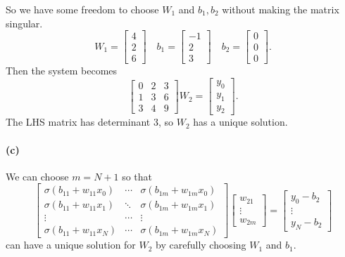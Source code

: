 \documentclass[12pt]{article}
\begin{document}
So we have some freedom to choose \(W_1\) and \(b_1, b_2\) without making the matrix singular.
\[ W_1=\begin{bmatrix} 4 \\ 2 \\ 6 \end{bmatrix} \hspace{1em}
   b_1=\begin{bmatrix} -1 \\ 2 \\ 3 \end{bmatrix} \hspace{1em}
   b_2=\begin{bmatrix} 0 \\ 0 \\ 0 \end{bmatrix}. \]
Then the system becomes
\[ \begin{bmatrix} 0 & 2 & 3 \\ 1 & 3 & 6 \\ 3 & 4 & 9 \end{bmatrix}W_2 = \begin{bmatrix} y_0 \\ y_1 \\ y_2 \end{bmatrix}. \]
The LHS matrix has determinant 3, so \(W_2\) has a unique solution.
\paragraph{(c)}
We can choose \(m=N+1\) so that
\[ \begin{bmatrix} \sigma(b_{11}+w_{11}x_0) & \cdots & \sigma(b_{1m}+w_{1m}x_0) \\
    \sigma(b_{11}+w_{11}x_1) & \ddots & \sigma(b_{1m}+w_{1m}x_1) \\ 
    \vdots & \cdots & \vdots \\
    \sigma(b_{11}+w_{11}x_{N}) & \cdots & \sigma(b_{1m}+w_{1m}x_N) \end{bmatrix}
    \begin{bmatrix} w_{21} \\ \vdots \\ w_{2m} \end{bmatrix} = 
    \begin{bmatrix} y_0-b_2 \\ \vdots \\ y_N-b_2 \end{bmatrix} \]
can have a unique solution for \(W_2\) by carefully choosing \(W_1\) and \(b_1\).
\end{document}
